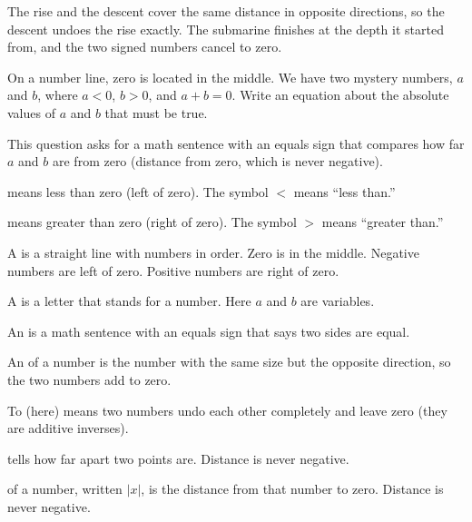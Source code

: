 
\noindent The rise and the descent cover the same distance in opposite
directions, so the descent undoes the rise exactly. The submarine finishes at
the depth it started from, and the two signed numbers cancel to zero.


\noindent On a number line, zero is located in the middle. We have two mystery numbers, $a$ and $b$, where $a < 0$, $b > 0$,
and $a + b = 0$. Write an equation about the absolute values of $a$ and $b$
that must be true.


\noindent This question asks for a math sentence with an equals sign that
compares how far $a$ and $b$ are from zero (distance from zero, which is never
negative).

\begin{words}
  \item {}means less than zero (left of zero). The symbol $<$ means ``less than.''
  \item {}means greater than zero (right of zero). The symbol $>$ means ``greater than.''
  \item A is a straight line with numbers in order. Zero is in the middle.
        Negative numbers are left of zero. Positive numbers are right of zero.
  \item A is a letter that stands for a number. Here $a$ and $b$ are variables.
  \item An is a math sentence with an equals sign that says two sides are equal.
  \item An of a number is the number with the same size but the opposite
        direction, so the two numbers add to zero.
  \item To (here) means two numbers undo each other completely and leave zero
        (they are additive inverses).
  \item {}tells how far apart two points are. Distance is never negative.
  \item {}of a number, written $|x|$, is the distance from that number to zero.
        Distance is never negative.
\end{words}

